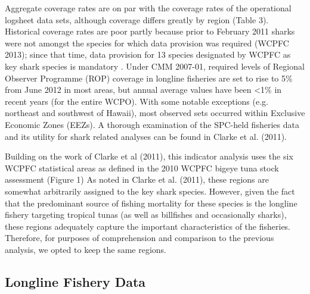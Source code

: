\documentclass[12pt]{SCreport}
\begin{document}
Aggregate coverage rates are on par with the coverage rates of the operational logsheet data sets, although coverage differs greatly by region (Table 3). Historical coverage rates are poor partly because prior to February 2011 sharks were not amongst the species for which data provision was required (WCPFC 2013); since that time, data provision for 13 species designated by WCPFC as key shark species is mandatory . Under CMM 2007-01, required levels of Regional Observer Programme (ROP) coverage in longline fisheries are set to rise to 5\% from June 2012 in most areas, but annual average values have been <1\% in recent years (for the entire WCPO). With some notable exceptions (e.g. northeast and southwest of Hawaii), most observed sets occurred within Exclusive Economic Zones (EEZs). A thorough examination of the SPC-held fisheries data and its utility for shark related analyses can be found in Clarke et al. (2011).

Building on the work of Clarke et al (2011), this indicator analysis uses the six WCPFC statistical areas as defined in the 2010 WCPFC bigeye tuna stock assessment (Figure 1) As noted in Clarke et al. (2011), these regions are somewhat arbitrarily assigned to the key shark species. However, given the fact that the predominant source of fishing mortality for these species is the longline fishery targeting tropical tunas (as well as billfishes and occasionally sharks), these regions adequately capture the important characteristics of the fisheries. Therefore, for purposes of comprehension and comparison to the previous analysis, we opted to keep the same regions. 



\subsection{Longline Fishery Data}
  
\end{document}

